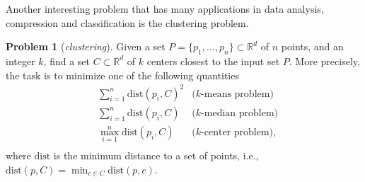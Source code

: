 \documentclass[a4paper,11pt,oneside,english,onecolumn]{article}
\theoremstyle{definition}
\newtheorem{problem}{Problem}
\newcommand{\dist}[0]{\ensuremath{\mathrm{dist}}}
\newcommand{\REAL}{\ensuremath{\mathbb{R}}}
\begin{document}
Another interesting problem that has many applications in data analysis, compression and classification is the clustering problem.

\begin{problem}[\emph{clustering}] Given a set $P=\{p_1,\ldots,p_n\}\subset\REAL^d$ of $n$ points, and an integer $k$, find a set $C\subset\REAL^d$ of $k$ centers closest to the input set $P$. More precisely, the task is to minimize one of the following quantities
\begin{align*}
&\sum_{i=1}^n \dist(p_i, C)^2 		&\text{($k$-means problem)} \\
&\sum_{i=1}^n \dist(p_i, C) 	&\text{($k$-median problem)} \\
&\max_{i=1}^n \dist(p_i, C) 	&\text{($k$-center problem)}, \\
\end{align*}
where $\dist$ is the minimum distance to a set of points, i.e., $\dist(p,C) = \min_{c \in C} \dist(p,c)$.
\end{problem}
\end{document}
